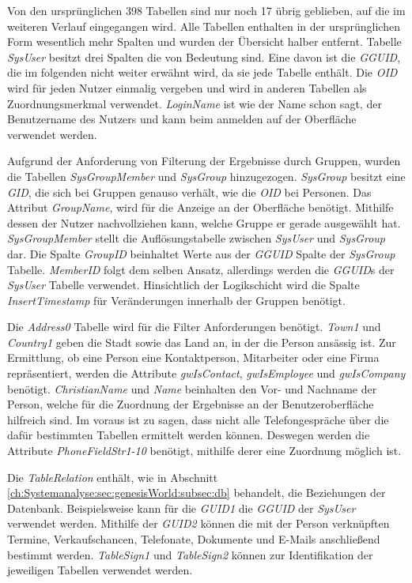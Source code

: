 Von den ursprünglichen 398 Tabellen sind nur noch 17 übrig geblieben, auf die im weiteren Verlauf eingegangen wird. Alle Tabellen enthalten in der ursprünglichen Form wesentlich mehr Spalten und wurden der Übersicht halber entfernt. Tabelle \textit{SysUser} besitzt drei Spalten die von Bedeutung sind. Eine davon ist die \textit{GGUID}, die im folgenden nicht weiter erwähnt wird, da sie jede Tabelle enthält. Die \textit{OID} wird für jeden Nutzer einmalig vergeben und wird in anderen Tabellen als Zuordnungsmerkmal verwendet. \textit{LoginName} ist wie der Name schon sagt, der Benutzername des Nutzers und kann beim anmelden auf der Oberfläche verwendet werden. 

Aufgrund der Anforderung von Filterung der Ergebnisse durch Gruppen, wurden die Tabellen \textit{SysGroupMember} und \textit{SysGroup} hinzugezogen. \textit{SysGroup} besitzt eine \textit{GID}, die sich bei Gruppen genauso verhält, wie die \textit{OID} bei Personen. Das Attribut \textit{GroupName}, wird für die Anzeige an der Oberfläche benötigt. Mithilfe dessen der Nutzer nachvollziehen kann, welche Gruppe er gerade ausgewählt hat. \textit{SysGroupMember} stellt die Auflösungstabelle zwischen \textit{SysUser} und \textit{SysGroup} dar. Die Spalte \textit{GroupID} beinhaltet Werte aus der \textit{GGUID} Spalte der \textit{SysGroup} Tabelle. \textit{MemberID} folgt dem selben Ansatz, allerdings werden die \textit{GGUID}s der \textit{SysUser} Tabelle verwendet. Hinsichtlich der Logikschicht wird die Spalte \textit{InsertTimestamp} für Veränderungen innerhalb der Gruppen benötigt.

Die \textit{Address0} Tabelle wird für die Filter Anforderungen benötigt. \textit{Town1} und \textit{Country1} geben die Stadt sowie das Land an, in der die Person ansässig ist. Zur Ermittlung, ob eine Person eine Kontaktperson, Mitarbeiter oder eine Firma repräsentiert, werden die Attribute \textit{gwIsContact}, \textit{gwIsEmployee} und \textit{gwIsCompany} benötigt. \textit{ChristianName} und \textit{Name} beinhalten den Vor- und Nachname der Person, welche für die Zuordnung der Ergebnisse an der Benutzeroberfläche hilfreich sind. Im voraus ist zu sagen, dass nicht alle Telefongespräche über die dafür bestimmten Tabellen ermittelt werden können. Deswegen werden die Attribute \textit{PhoneFieldStr1-10} benötigt, mithilfe derer eine Zuordnung möglich ist. 

Die \textit{TableRelation} enthält, wie in Abschnitt \ref{ch:Systemanalyse:sec:genesisWorld:subsec:db} behandelt, die Beziehungen der Datenbank. Beispielsweise kann für die \textit{GUID1} die \textit{GGUID} der \textit{SysUser} verwendet werden. Mithilfe der \textit{GUID2} können die mit der Person verknüpften Termine, Verkaufschancen, Telefonate, Dokumente und E-Mails anschließend bestimmt werden. \textit{TableSign1} und \textit{TableSign2} können zur Identifikation der jeweiligen Tabellen verwendet werden.

